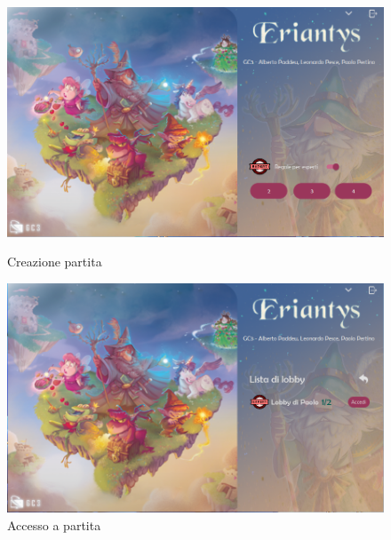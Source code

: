 \documentclass[a4paper, 12pt]{article}
\begin{document}
	\begin{figure}[!htb]
		\begin{minipage}{0.495\textwidth}
			\centering
			\includegraphics[width=\linewidth]{launcher_3.png}
			\caption{Creazione partita}
		\end{minipage}\hfill
		\begin{minipage}{0.495\textwidth}
			\centering
			\includegraphics[width=\linewidth]{launcher_4.png}
			\caption{Accesso a partita}
		\end{minipage}
	\end{figure}
\end{document}
